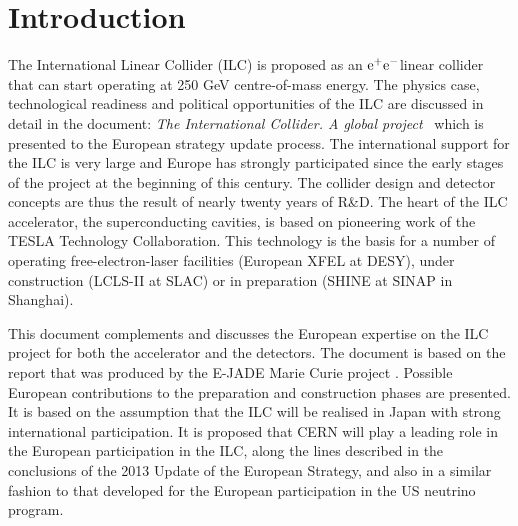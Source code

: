 \documentclass[%
 reprint,
 floatfix,
 amsmath,amssymb,
 aps,
]{revtex4-1}
\newcommand{\epem}{\mbox{${\rm e}^+{\rm e}^-$}}
\begin{document}
\pagebreak

\pagestyle{plain}
\setcounter{page}{1}

\twocolumngrid

\section{\label{sec:intro}Introduction}

The International Linear Collider (ILC) is proposed as an \epem linear collider that can start operating at  250 GeV centre-of-mass energy. The physics case, technological readiness and political opportunities of the ILC are discussed in detail in the document: \emph{The International Collider. A global project}~\cite{ILCESU1} which is presented to the European strategy update process. The international  support for the ILC is very large and Europe has strongly participated since the early stages of the project at the beginning of this century.   The collider design and detector concepts are thus the result of nearly twenty years of R\&D. The heart of the ILC accelerator, the superconducting cavities, is based on pioneering work of the TESLA Technology Collaboration. This technology is the basis for a number of operating free-electron-laser facilities (European XFEL at DESY), under construction (LCLS-II at SLAC) or in preparation (SHINE at SINAP in Shanghai).

This document complements \cite{ILCESU1} and discusses the European expertise on the ILC project for both the accelerator and the detectors. The document is based on the report \cite{ejade-report} that was produced by the E-JADE Marie Curie project \cite{ejade}. Possible European contributions to the preparation and construction phases are presented. It is based on the assumption that the ILC will be realised in Japan with strong international participation. 
It is proposed that CERN will play a leading role in the European participation in the ILC, along the lines described in the  conclusions of the 2013 Update of the European Strategy, and also in a similar fashion to that  developed for the European participation in the US neutrino program.  
\end{document}
